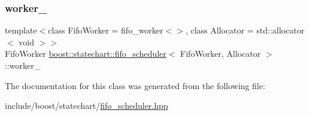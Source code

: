 \mbox{\label{classboost_1_1statechart_1_1fifo__scheduler_a6ff99598f5cdf7c170450a9ac100767b}} 
\subsubsection{\texorpdfstring{worker\+\_\+}{worker\_}}
{\footnotesize\ttfamily template$<$class Fifo\+Worker = fifo\+\_\+worker$<$$>$, class Allocator = std\+::allocator$<$ void $>$$>$ \\
Fifo\+Worker \mbox{\hyperlink{classboost_1_1statechart_1_1fifo__scheduler}{boost\+::statechart\+::fifo\+\_\+scheduler}}$<$ Fifo\+Worker, Allocator $>$\+::worker\+\_\+\hspace{0.3cm}{\ttfamily [private]}}



The documentation for this class was generated from the following file\+:\begin{DoxyCompactItemize}
\item 
include/boost/statechart/\mbox{\hyperlink{fifo__scheduler_8hpp}{fifo\+\_\+scheduler.\+hpp}}\end{DoxyCompactItemize}
